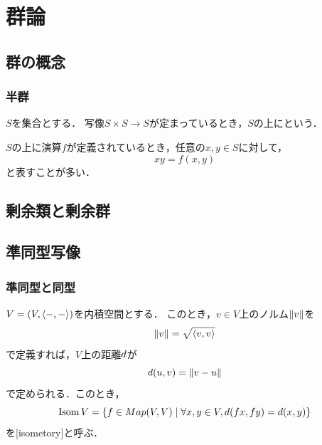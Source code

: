\documentclass{jlreq}
\begin{document}
\section{群論}

\subsection{群の概念}

\subsubsection{半群}

\begin{definition}
  $S$を集合とする．
  写像$S \times S \to S$が定まっているとき，$S$の上にという．
\end{definition}

$S$の上に演算$f$が定義されているとき，任意の$x, y \in S$に対して，
\begin{equation}
  xy = f(x, y)
\end{equation}
と表すことが多い．

\subsection{剰余類と剰余群}

\subsection{準同型写像}

\subsubsection{準同型と同型}

$V = \tuple{V, \innerproduct{\dummy}{\dummy}}$を内積空間とする．
このとき，$v \in V$上のノルム$\norm{v}$を
\begin{equation}
  \norm{v} = \sqrt{\innerproduct{v}{v}}
\end{equation}
で定義すれば，$V$上の距離$\distance{d}$が
\begin{equation}
  \distance{d}(u, v) = \norm{v - u}
\end{equation}
で定められる．このとき，
\begin{equation}
  \isometries V = \{ f \in Map(V, V) \mid \forall x, y \in V, \distance{d}(fx, fy) = \distance{d}(x, y) \}
\end{equation}
を[isometory]と呼ぶ．

\printindex
\end{document}
